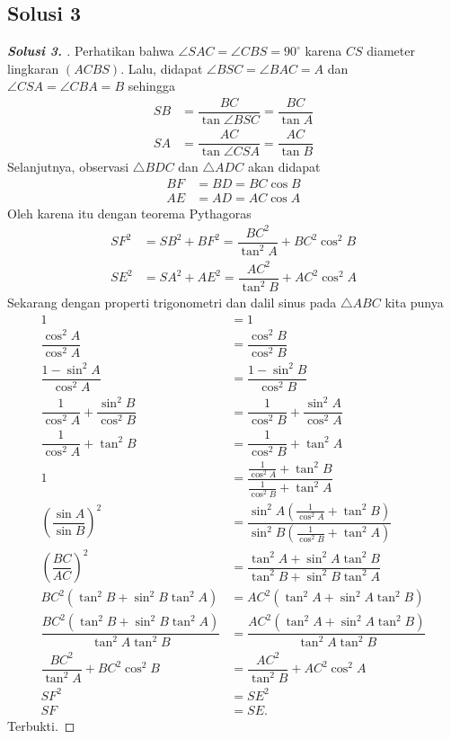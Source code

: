 \documentclass[12pt]{scrartcl}
\begin{document}
\subsection{Solusi 3}
\begin{proof}[\textbf{Solusi 3. }] 
Perhatikan bahwa $\angle SAC = \angle CBS = 90^\circ$ karena $CS$ diameter lingkaran $(ACBS)$. Lalu, didapat $\angle BSC = \angle BAC = A$ dan $\angle CSA = \angle CBA = B$ sehingga
\begin{align*}
    SB &= \dfrac{BC}{\tan \angle BSC} = \dfrac{BC}{\tan A}\\
    SA &= \dfrac{AC}{\tan \angle CSA} = \dfrac{AC}{\tan B}
\end{align*}
Selanjutnya, observasi $\triangle BDC$ dan $\triangle ADC$ akan didapat
\begin{align*}
    BF &= BD = BC \cos B\\
    AE &= AD = AC \cos A
\end{align*}
Oleh karena itu dengan teorema Pythagoras
\begin{align*}
    SF^2 &= SB^2 + BF^2 = \dfrac{BC^2}{\tan^2 A} + BC^2 \cos^2 B\\
    SE^2 &= SA^2 + AE^2 = \dfrac{AC^2}{\tan^2 B} + AC^2 \cos^2 A
\end{align*}
Sekarang dengan properti trigonometri dan dalil sinus pada $\triangle ABC$ kita punya
\begin{align*}
    1 &= 1\\
    \dfrac{\cos^2 A}{\cos^2 A} &= \dfrac{\cos^2 B}{\cos^2 B}\\
    \dfrac{1-\sin^2 A}{\cos^2 A} &= \dfrac{1-\sin^2 B}{\cos^2 B}\\
    \dfrac{1}{\cos^2 A}+\dfrac{\sin^2 B}{\cos^2 B} &= \dfrac{1}{\cos^2 B}+\dfrac{\sin^2 A}{\cos^2 A}\\
    \dfrac{1}{\cos^2 A}+\tan^2 B &= \dfrac{1}{\cos^2 B}+\tan^2 A\\
    1 &= \dfrac{\frac{1}{\cos^2 A}+\tan^2 B}{\frac{1}{\cos^2 B}+\tan^2 A}\\
    \left(\dfrac{\sin A}{\sin B}\right)^2 &= \dfrac{\sin^2 A\left(\frac{1}{\cos^2 A}+\tan^2 B\right)}{\sin^2 B\left(\frac{1}{\cos^2 B}+\tan^2 A\right)}\\
    \left(\dfrac{BC}{AC}\right)^2 &= \dfrac{\tan^2 A + \sin^2 A \tan^2 B}{\tan^2 B + \sin^2 B \tan^2 A}\\
    BC^2(\tan^2 B + \sin^2 B \tan^2 A) &= AC^2(\tan^2 A + \sin^2 A \tan^2 B)\\
    \dfrac{BC^2(\tan^2 B + \sin^2 B \tan^2 A)}{\tan^2 A \tan^2 B} &= \dfrac{AC^2(\tan^2 A + \sin^2 A \tan^2 B)}{\tan^2 A \tan^2 B}\\
    \dfrac{BC^2}{\tan^2 A} + BC^2 \cos^2 B &= \dfrac{AC^2}{\tan^2 B} + AC^2 \cos^2 A\\
    SF^2 &= SE^2\\
    SF &= SE.
\end{align*}
Terbukti.
\end{proof}
\end{document}
